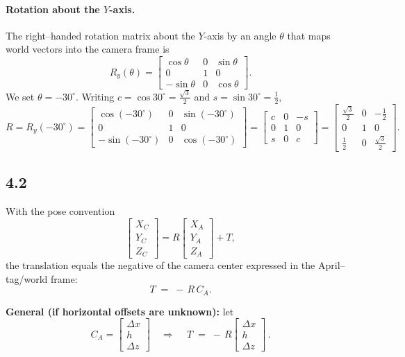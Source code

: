 \documentclass[12pt]{article}
\begin{document}
\paragraph{Rotation about the \(Y\)-axis.}
The right–handed rotation matrix about the \(Y\)-axis by an angle \(\theta\) that maps
world vectors into the camera frame is
\[
R_y(\theta)=
\begin{bmatrix}
\cos\theta & 0 & \sin\theta\\
0 & 1 & 0\\
-\sin\theta & 0 & \cos\theta
\end{bmatrix}.
\]
We set \(\theta=-30^\circ\). Writing \(c\!=\!\cos 30^\circ=\tfrac{\sqrt3}{2}\) and
\(s\!=\!\sin 30^\circ=\tfrac12\),
\[
R
=R_y(-30^\circ)
=\begin{bmatrix}
\cos(-30^\circ) & 0 & \sin(-30^\circ)\\
0 & 1 & 0\\
-\sin(-30^\circ) & 0 & \cos(-30^\circ)
\end{bmatrix}
=\begin{bmatrix}
c & 0 & -s\\
0 & 1 & 0\\
s & 0 & c
\end{bmatrix}
=
\begin{bmatrix}
\frac{\sqrt3}{2} & 0 & -\frac12\\[4pt]
0 & 1 & 0\\[4pt]
\frac12 & 0 & \frac{\sqrt3}{2}
\end{bmatrix}.
\]

\subsection*{4.2}
With the pose convention
\[
\begin{bmatrix}X_C\\Y_C\\Z_C\end{bmatrix}
= R\begin{bmatrix}X_A\\Y_A\\Z_A\end{bmatrix} + T,
\]
the translation equals the negative of the camera center expressed in the April–tag/world frame:
\[
T \;=\; -\,R\,C_A.
\]

\textbf{General (if horizontal offsets are unknown):}
let
\[
C_A=\begin{bmatrix}\Delta x\\ h\\ \Delta z\end{bmatrix}
\quad\Rightarrow\quad
\boxed{\,T \;=\; -\,R\begin{bmatrix}\Delta x\\ h\\ \Delta z\end{bmatrix}\, .}
\]
\end{document}
